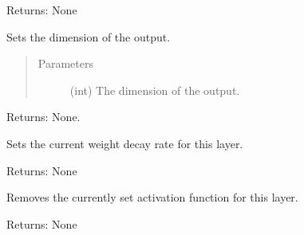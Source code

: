\documentclass[letterpaper,10pt,english,openany,oneside]{sphinxmanual}
\begin{document}
\begin{fulllineitems}
\begin{fulllineitems}
\begin{quote}
\begin{description}
\end{description}\end{quote}

Returns: None

\end{fulllineitems}


\begin{fulllineitems}
\label{\detokenize{_modules/layers:layers.FC.FC.set_output_dim}}
Sets the dimension of the output.
\begin{quote}\begin{description}
\item[{Parameters}] \leavevmode
{} \textendash{} (int) The dimension of the output.

\end{description}\end{quote}

Returns: None.

\end{fulllineitems}


\begin{fulllineitems}
\label{\detokenize{_modules/layers:layers.FC.FC.set_weight_decay}}
Sets the current weight decay rate for this layer.

Returns: None

\end{fulllineitems}


\begin{fulllineitems}
\label{\detokenize{_modules/layers:layers.FC.FC.unset_activation}}
Removes the currently set activation function for this layer.

Returns: None

\end{fulllineitems}


\end{fulllineitems}
\end{document}
